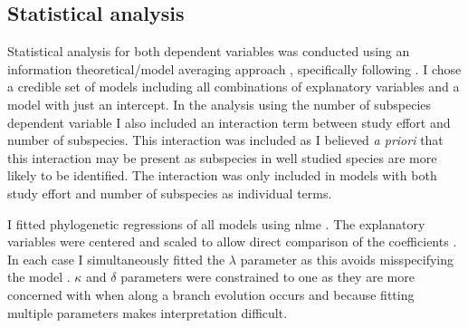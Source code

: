 


\subsection{Statistical analysis}

Statistical analysis for both dependent variables was conducted using an information theoretical/model averaging approach \cite{burnham2002model}, specifically following \textcite{whittingham2005habitat, whittingham2006we}.
I chose a credible set of models including all combinations of explanatory variables and a model with just an intercept.
In the analysis using the number of subspecies dependent variable I also included an interaction term between study effort and number of subspecies.
This interaction was included as I believed \emph{a priori} that this interaction may be present as subspecies in well studied species are more likely to be identified.
The interaction was only included in models with both study effort and number of subspecies as individual terms.

I fitted phylogenetic regressions of all models using nlme \cite{nlme}.
The explanatory variables were centered and scaled to allow direct comparison of the coefficients \cite{schielzeth2010simple}.
In each case I simultaneously fitted the $\lambda$ parameter as this avoids misspecifying the model \cite{revell2010phylogenetic}.
$\kappa$ and $\delta$ parameters were constrained to one as they are more concerned with when along a branch evolution occurs and because fitting multiple parameters makes interpretation difficult. 

